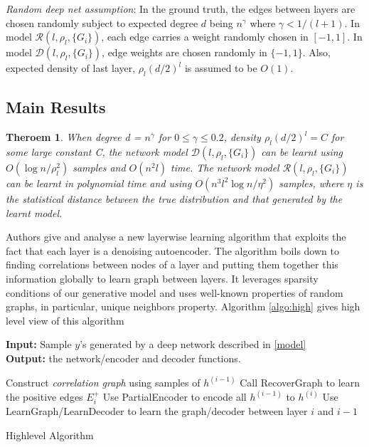 \documentclass[11pt]{article}
\newtheorem{thm}{Theroem}
\begin{document}
	\emph{Random deep net assumption}: In the ground truth, the edges between layers are chosen randomly subject to expected degree $d$ being $n^\gamma$ where $\gamma < 1/(l+1)$. In model $\mathcal{R}(l,\rho_l,\{G_i\})$, each edge carries a weight randomly chosen in $[-1,1]$. In model $\mathcal{D}(l,\rho_l,\{G_i\})$, edge weights are chosen randomly in $\{-1,1\}$. Also, expected density of last layer, $\rho_l(d/2)^l$ is assumed to be $O(1)$.
	


	\subsection{Main Results}
	\label{ref:results}
	\begin{thm}
		When degree d = $n^\gamma$ for $0\leq\gamma\leq 0.2$, density $\rho_l(d/2)^l = C$ for some large constant C, the network model  $\mathcal{D}(l,\rho_l,\{G_i\})$ can be learnt using  $O(\log n/\rho_l^2)$ samples and $O(n^2l)$ time. The network model $\mathcal{R}(l,\rho_l,\{G_i\})$ can be learnt in polynomial time and using $O(n^3l^2\log n/\eta^2)$ samples, where $\eta$ is the statistical distance between the true distribution and that generated by the learnt model.
	\end{thm}

	Authors give and analyse a new layerwise learning algorithm that exploits the fact that each layer is a denoising autoencoder. The algorithm boils down to finding correlations between nodes of a layer and putting them together this information globally to learn graph between layers. It leverages sparsity conditions of our generative model and uses well-known properties of random graphs, in particular, unique neighbors property. Algorithm \ref{algo:high} gives high level view of this algorithm

	\begin{algorithm}[h]
		\label{algo:high}
		\textbf{Input:} Sample $y$'s generated by a deep network described in \ref{model}\\
		\textbf{Output:} the network/encoder and decoder functions.
		\begin{algorithmic}[1]
			\STATE Construct \emph{correlation graph} using samples of $h^{(i-1)}$
			\STATE Call RecoverGraph to learn the positive edges $E_i^+$
			\STATE Use PartialEncoder to encode all $h^{(i-1)}$ to $h^{(i)}$
			\STATE Use LearnGraph/LearnDecoder to learn the graph/decoder between layer $i$ and $i-1$
			\ENDFOR
		\end{algorithmic}
		\caption{Highlevel Algorithm}
	\end{algorithm}
\end{document}
